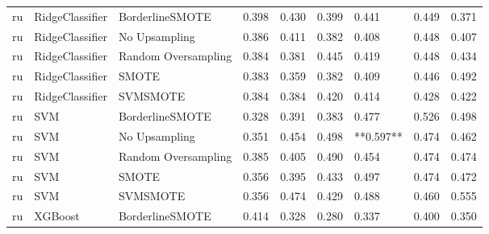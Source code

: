 \begin{tabular}{lllllllll}
      ru &              RidgeClassifier &     BorderlineSMOTE & 0.398 &                     0.430 &                 0.399 &                  0.441 &                                   0.449 &     0.371 \\
      ru &              RidgeClassifier &       No Upsampling & 0.386 &                     0.411 &                 0.382 &                  0.408 &                                   0.448 &     0.407 \\
      ru &              RidgeClassifier & Random Oversampling & 0.384 &                     0.381 &                 0.445 &                  0.419 &                                   0.448 &     0.434 \\
      ru &              RidgeClassifier &               SMOTE & 0.383 &                     0.359 &                 0.382 &                  0.409 &                                   0.446 &     0.492 \\
      ru &              RidgeClassifier &            SVMSMOTE & 0.384 &                     0.384 &                 0.420 &                  0.414 &                                   0.428 &     0.422 \\
      ru &                          SVM &     BorderlineSMOTE & 0.328 &                     0.391 &                 0.383 &                  0.477 &                                   0.526 &     0.498 \\
      ru &                          SVM &       No Upsampling & 0.351 &                     0.454 &                 0.498 &              **0.597** &                                   0.474 &     0.462 \\
      ru &                          SVM & Random Oversampling & 0.385 &                     0.405 &                 0.490 &                  0.454 &                                   0.474 &     0.474 \\
      ru &                          SVM &               SMOTE & 0.356 &                     0.395 &                 0.433 &                  0.497 &                                   0.474 &     0.472 \\
      ru &                          SVM &            SVMSMOTE & 0.356 &                     0.474 &                 0.429 &                  0.488 &                                   0.460 &     0.555 \\
      ru &                      XGBoost &     BorderlineSMOTE & 0.414 &                     0.328 &                 0.280 &                  0.337 &                                   0.400 &     0.350 \\

\end{tabular}
